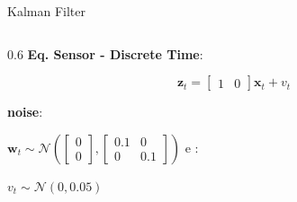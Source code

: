 \documentclass[aspectratio=169]{beamer}
\begin{document}
\begin{frame}[c]{Kalman Filter}
\begin{columns}
\begin{column}[c]{0.6\textwidth}
            \textbf{Eq. Sensor - Discrete Time}:

            \begin{equation*}
                \mathbf{z}_t = 
                \begin{bmatrix}
                        1 & 0
                \end{bmatrix}
                \mathbf{x}_{t} +
                v_{t}
            \end{equation*}            

            \textbf{noise}:

            $\mathbf{w}_t \sim \mathcal{N} 
                \left(
                    \begin{bmatrix}
                    0 \\ 0    
                    \end{bmatrix},
                    \begin{bmatrix}
                    0.1 & 0 \\
                    0   & 0.1
                \end{bmatrix}
                \right)$ e :
            
            $ v_t \sim \mathcal{N} (0,0.05)$

        \end{column}
    \end{columns}
\end{frame}
\end{document}
